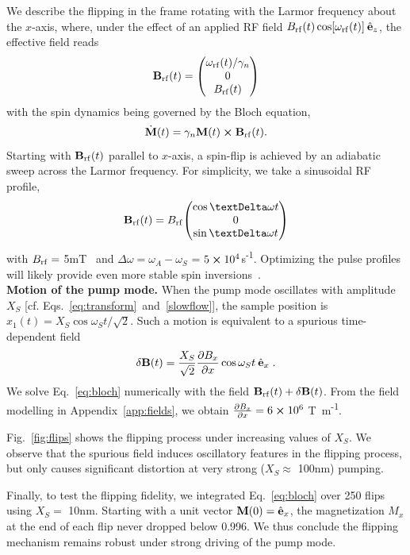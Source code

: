 We describe the flipping in the frame rotating with the Larmor frequency about the $x$-axis, where, under the effect of an applied RF field $B_{\rm rf}(t) \cos[\omega_{\rm rf} (t)]\: \hat{\vb{e}}_z$, the effective field reads
\begin{equation}
\vb{B}_{\rm rf}(t) = \mqty(\omega_{\rm rf}(t) / \gamma_n \\0 \\ B_{\rm rf}(t) )
\end{equation}
with the spin dynamics being governed by the Bloch equation,
\begin{equation} \label{eq:bloch}
\dot{\vb{M}}(t) = \gamma_n \vb{M}(t) \cross \vb{B}_{\rm rf}(t) .
\end{equation}
Starting with $\vb{B}_{\rm rf} (t)$ parallel to $x$-axis, a spin-flip is achieved by an adiabatic sweep across the Larmor frequency. For simplicity, we take a sinusoidal RF profile,
\begin{equation}
\vb{B}_{\rm rf}(t) = B_{\rm rf}\mqty(\cos{\Delta \omega t} \\ 0 \\ \sin{\Delta \omega t})
\end{equation}
with $B_{\rm rf} = $ 5\;mT~\cite{Grob_2019} and $\Delta\omega = \omega_A - \omega_S$ = $5\cross10^4$\;s\textsuperscript{-1}. Optimizing the pulse profiles will likely provide even more stable spin inversions~\cite{Grob_2019}.
\\

\textbf{Motion of the pump mode.} When the pump mode oscillates with amplitude $X_S$ [cf. Eqs.~\eqref{eq:transform}~and~\eqref{slowflow}], the sample position is $x_1(t) =  X_S \cos{\omega_S t} / \sqrt{2}$. Such a motion is equivalent to a spurious time-dependent field
\begin{equation}
\delta \vb{B}(t) = \frac{X_S}{\sqrt{2}} \frac{\partial B_x}{\partial x} \cos{\omega_S t}\: \hat{\vb{e}}_x \;.
\end{equation}
We solve Eq.~\eqref{eq:bloch} numerically with the field $\vb{B}_{\rm rf}(t) + \delta \vb{B}(t)$. From the field modelling in Appendix~\ref{app:fields}, we obtain $\frac{\partial B_x}{\partial x}=6\cross10^6$ T~m\textsuperscript{-1}.

Fig.~\ref{fig:flips} shows the flipping process under increasing values of $X_S$. We observe that the spurious field induces oscillatory features in the flipping process, but only causes significant distortion at very strong ($X_S \approx$ 100\;nm) pumping.

Finally, to test the flipping fidelity, we integrated Eq.~\ref{eq:bloch} over 250 flips using $X_S=$ 10\;nm. Starting with a unit vector $\vb{M}(0)=\hat{\vb{e}}_x$, the magnetization $M_x$ at the end of each flip never dropped below 0.996. We thus conclude the flipping mechanism remains robust under strong driving of the pump mode.
\\

